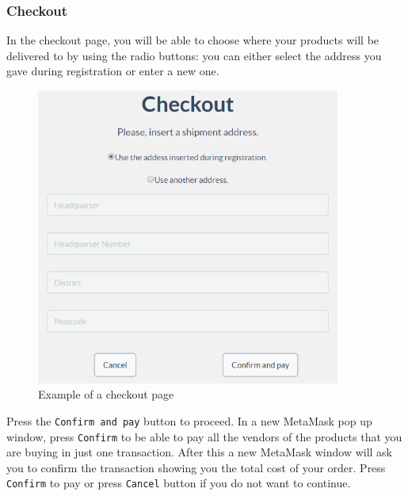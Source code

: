 		\subsubsection{Checkout}
		In the checkout page, you will be able to choose where your products 
		will be delivered to by using the radio buttons: you can either select 
		the address you gave during registration or enter a new one.
	\begin{figure}[H]
		\includegraphics[width=10cm]{res/images/checkout.png}
		\centering
		\caption{Example of a checkout page}
	\end{figure}
	\noindent Press the \texttt{Confirm and pay} button to proceed. In a new 
	MetaMask\glo{} pop up window, press \texttt{Confirm} to be able to pay all the 
	vendors of the products that you are buying in just one transaction. After this 
	a new MetaMask\glo{} window will ask you to confirm the transaction showing you 
	the total cost of your order. Press \texttt{Confirm} to pay or press \texttt{Cancel}
	button if you do not want to continue.
